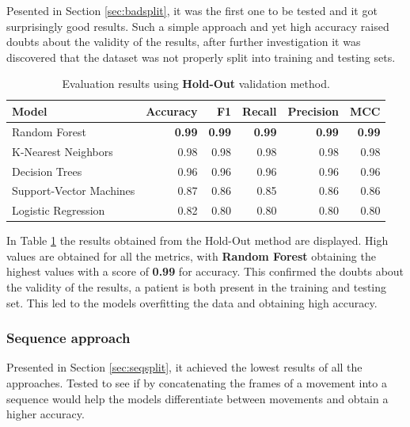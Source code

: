                 Pesented in Section \ref{sec:badsplit}, it was the first one to be tested and it got surprisingly good results. Such a simple approach and yet high accuracy raised doubts about the validity of the results, after further investigation it was discovered that the dataset was not properly split into training and testing sets. 
            
                \begin{table}[htbp]
                    \centering
                    \caption{Evaluation results using \textbf{Hold-Out} validation method.}
                    \label{tab:wrong_approach_holdout}
                    \begin{tabular}{lrrrrr}
                        \toprule
                        \textbf{Model} & \textbf{Accuracy} & \textbf{F1} & \textbf{Recall} & \textbf{Precision} & \textbf{MCC} \\
                        \midrule
                        Random Forest & \textbf{0.99} & \textbf{0.99} & \textbf{0.99} & \textbf{0.99} & \textbf{0.99} \\
                        K-Nearest Neighbors & 0.98 & 0.98 & 0.98 & 0.98 & 0.98 \\
                        Decision Trees & 0.96 & 0.96 & 0.96 & 0.96 & 0.96 \\
                        Support-Vector Machines & 0.87 & 0.86 & 0.85 & 0.86 & 0.86 \\
                        Logistic Regression & 0.82 & 0.80 & 0.80 & 0.80 & 0.80 \\
                        \bottomrule
                    \end{tabular}
                \end{table}

                In Table \ref{tab:wrong_approach_holdout} the results obtained from the Hold-Out method are displayed. High values are obtained for all the metrics, with \textbf{Random Forest} obtaining the highest values with a score of \textbf{0.99} for accuracy. This confirmed the doubts about the validity of the results, a patient is both present in the training and testing set. This led to the models overfitting the data and obtaining high accuracy.

            \subsubsection{Sequence approach}

                Presented in Section \ref{sec:seqsplit}, it achieved the lowest results of all the approaches. Tested to see if by concatenating the frames of a movement into a sequence would help the models differentiate between movements and obtain a higher accuracy. 
                
